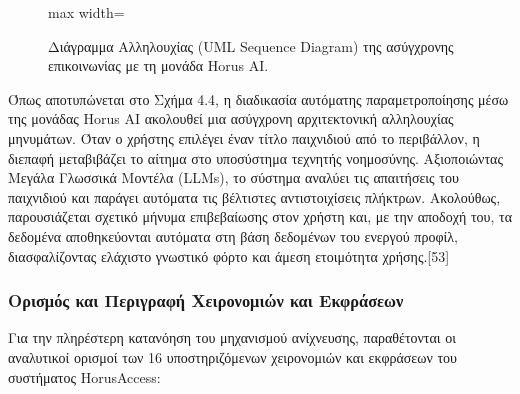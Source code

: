 \documentclass[twoside, a4paper, 11pt]{article}
\newcommand{\textlatin}[1]{\textenglish{#1}}
\begin{document}
\begin{figure}[H]
\begin{adjustbox}{max width=\textwidth}
    \end{adjustbox}
    \caption{Διάγραμμα Αλληλουχίας (UML Sequence Diagram) της ασύγχρονης επικοινωνίας με τη μονάδα Horus AI.}
    \label{fig:sequence_horus_ai}
\end{figure}

Όπως αποτυπώνεται στο Σχήμα 4.4, η διαδικασία αυτόματης παραμετροποίησης μέσω της μονάδας Horus AI ακολουθεί μια ασύγχρονη αρχιτεκτονική αλληλουχίας μηνυμάτων. Όταν ο χρήστης επιλέγει έναν τίτλο παιχνιδιού από το περιβάλλον, η διεπαφή μεταβιβάζει το αίτημα στο υποσύστημα τεχνητής νοημοσύνης. Αξιοποιώντας Μεγάλα Γλωσσικά Μοντέλα (LLMs), το σύστημα αναλύει τις απαιτήσεις του παιχνιδιού και παράγει αυτόματα τις βέλτιστες αντιστοιχίσεις πλήκτρων. Ακολούθως, παρουσιάζεται σχετικό μήνυμα επιβεβαίωσης στον χρήστη και, με την αποδοχή του, τα δεδομένα αποθηκεύονται αυτόματα στη βάση δεδομένων του ενεργού προφίλ, διασφαλίζοντας ελάχιστο γνωστικό φόρτο και άμεση ετοιμότητα χρήσης.[53]


\subsubsection{Ορισμός και Περιγραφή Χειρονομιών και Εκφράσεων}

Για την πληρέστερη κατανόηση του μηχανισμού ανίχνευσης, παραθέτονται οι αναλυτικοί ορισμοί των 16 υποστηριζόμενων χειρονομιών και εκφράσεων του συστήματος \textlatin{HorusAccess}:
\end{document}
